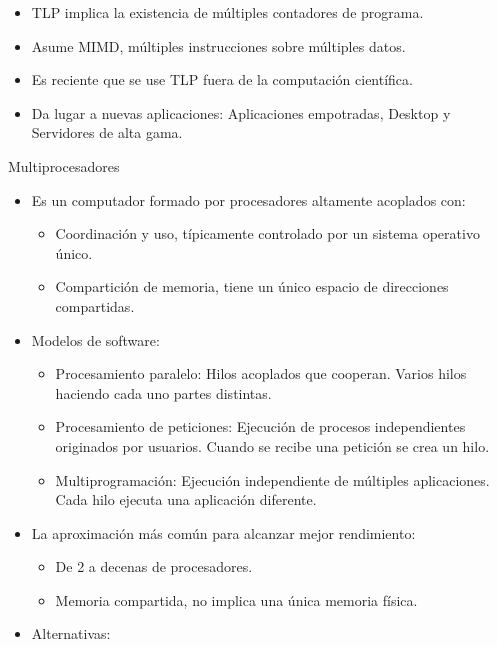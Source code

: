 \documentclass[12pt, twoside, openright]{report} %
\begin{document}
\begin{itemize}

	\item TLP implica la existencia de múltiples contadores de programa.
	\item Asume MIMD, múltiples instrucciones sobre múltiples datos.
	\item Es reciente que se use TLP fuera de la computación científica.
	\item Da lugar a nuevas aplicaciones: Aplicaciones empotradas, Desktop
	      y Servidores de alta gama.
\end{itemize}

Multiprocesadores
\vspace{-0.5cm}

\begin{itemize}
	\item Es un computador formado por procesadores altamente acoplados
	      con:

	      \begin{itemize}

		      \item Coordinación y uso, típicamente controlado por un sistema
		            operativo único.
		      \item Compartición de memoria, tiene un único espacio de direcciones
		            compartidas.
	      \end{itemize}
	\item Modelos de software:

	      \begin{itemize}

		      \item Procesamiento paralelo: Hilos acoplados que cooperan. Varios
		            hilos haciendo cada uno partes distintas.
		      \item Procesamiento de peticiones: Ejecución de procesos
		            independientes originados por usuarios. Cuando se recibe una
		            petición se crea un hilo.
		      \item Multiprogramación: Ejecución independiente de múltiples
		            aplicaciones. Cada hilo ejecuta una aplicación diferente.
	      \end{itemize}
	      \pagebreak
	\item La aproximación más común para alcanzar mejor rendimiento:

	      \begin{itemize}

		      \item De 2 a decenas de procesadores.
		      \item Memoria compartida, no implica una única memoria física.
	      \end{itemize}
	\item Alternativas:


\end{itemize}
\end{document}
